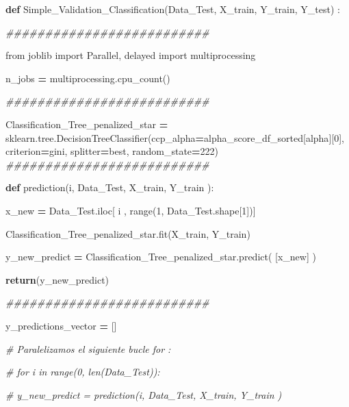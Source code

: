 \documentclass[
  11pt,
  a4paper,
]{article}
\newenvironment{Shaded}{\begin{snugshade}}{\end{snugshade}}
\newcommand{\BuiltInTok}[1]{#1}
\newcommand{\CommentTok}[1]{\textcolor[rgb]{0.56,0.35,0.01}{\textit{#1}}}
\newcommand{\ControlFlowTok}[1]{\textcolor[rgb]{0.13,0.29,0.53}{\textbf{#1}}}
\newcommand{\DecValTok}[1]{\textcolor[rgb]{0.00,0.00,0.81}{#1}}
\newcommand{\ImportTok}[1]{#1}
\newcommand{\KeywordTok}[1]{\textcolor[rgb]{0.13,0.29,0.53}{\textbf{#1}}}
\newcommand{\NormalTok}[1]{#1}
\newcommand{\OperatorTok}[1]{\textcolor[rgb]{0.81,0.36,0.00}{\textbf{#1}}}
\newcommand{\StringTok}[1]{\textcolor[rgb]{0.31,0.60,0.02}{#1}}
\begin{document}
\begin{Shaded}
\begin{Highlighting}[]
\KeywordTok{def}\NormalTok{ Simple\_Validation\_Classification(Data\_Test, X\_train, Y\_train, Y\_test) :}

    \CommentTok{\#\#\#\#\#\#\#\#\#\#\#\#\#\#\#\#\#\#\#\#\#\#\#\#\#\#}

    \ImportTok{from}\NormalTok{ joblib }\ImportTok{import}\NormalTok{ Parallel, delayed}
    \ImportTok{import}\NormalTok{ multiprocessing}

\NormalTok{    n\_jobs  }\OperatorTok{=}\NormalTok{ multiprocessing.cpu\_count()}

    \CommentTok{\#\#\#\#\#\#\#\#\#\#\#\#\#\#\#\#\#\#\#\#\#\#\#\#\#\#}

\NormalTok{    Classification\_Tree\_penalized\_star }\OperatorTok{=}\NormalTok{ sklearn.tree.DecisionTreeClassifier(ccp\_alpha}\OperatorTok{=}\NormalTok{alpha\_score\_df\_sorted[}\StringTok{\textquotesingle{}alpha\textquotesingle{}}\NormalTok{][}\DecValTok{0}\NormalTok{], criterion}\OperatorTok{=}\StringTok{\textquotesingle{}gini\textquotesingle{}}\NormalTok{, splitter}\OperatorTok{=}\StringTok{\textquotesingle{}best\textquotesingle{}}\NormalTok{, random\_state}\OperatorTok{=}\DecValTok{222}\NormalTok{)}
    \CommentTok{\#\#\#\#\#\#\#\#\#\#\#\#\#\#\#\#\#\#\#\#\#\#\#\#\#\#}

    \KeywordTok{def}\NormalTok{ prediction(i, Data\_Test, X\_train, Y\_train ):}

\NormalTok{     x\_new }\OperatorTok{=}\NormalTok{ Data\_Test.iloc[ i , }\BuiltInTok{range}\NormalTok{(}\DecValTok{1}\NormalTok{, Data\_Test.shape[}\DecValTok{1}\NormalTok{])]}

\NormalTok{     Classification\_Tree\_penalized\_star.fit(X\_train, Y\_train)}

\NormalTok{     y\_new\_predict }\OperatorTok{=}\NormalTok{ Classification\_Tree\_penalized\_star.predict( [x\_new] ) }
  
     \ControlFlowTok{return}\NormalTok{(y\_new\_predict)}

    \CommentTok{\#\#\#\#\#\#\#\#\#\#\#\#\#\#\#\#\#\#\#\#\#\#\#\#\#\#}

\NormalTok{    y\_predictions\_vector }\OperatorTok{=}\NormalTok{ []}

    \CommentTok{\# Paralelizamos el siguiente bucle for :}

    \CommentTok{\# for i in  range(0, len(Data\_Test)):}

        \CommentTok{\# y\_new\_predict = prediction(i, Data\_Test, X\_train, Y\_train )}


\end{Highlighting}
\end{Shaded}
\end{document}

